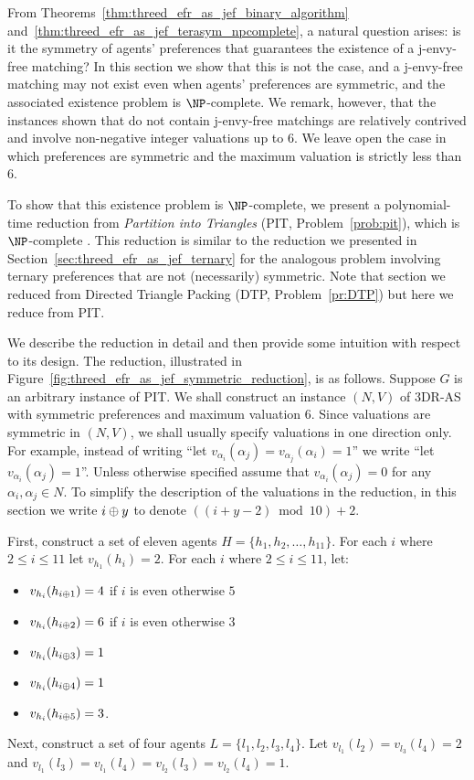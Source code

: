 From Theorems~\ref{thm:threed_efr_as_jef_binary_algorithm} and~\ref{thm:threed_efr_as_jef_terasym_npcomplete}, a natural question arises: is it the symmetry of agents' preferences that guarantees the existence of a j-envy-free matching? 
In this section we show that this is not the case, and a j-envy-free matching may not exist even when agents' preferences are symmetric, and the associated existence problem is $\NP$-complete. We remark, however, that the instances shown that do not contain j-envy-free matchings are relatively contrived and involve non-negative integer valuations up to $6$. We leave open the case in which preferences are symmetric and the maximum valuation is strictly less than $6$.

To show that this existence problem is $\NP$-complete, we present a polynomial-time reduction from \emph{Partition into Triangles} (PIT, Problem~\ref{prob:pit}), which is $\NP$-complete \cite{GJ79}. This reduction is similar to the reduction we presented in Section~\ref{sec:threed_efr_as_jef_ternary} for the analogous problem involving ternary preferences that are not (necessarily) symmetric. Note that section we reduced from Directed Triangle Packing (DTP, Problem~\ref{pr:DTP}) but here we reduce from PIT.

We describe the reduction in detail and then provide some intuition with respect to its design. The reduction, illustrated in Figure~\ref{fig:threed_efr_as_jef_symmetric_reduction}, is as follows. Suppose $G$ is an arbitrary instance of PIT. We shall construct an instance $(N, V)$ of 3DR-AS with symmetric preferences and maximum valuation $6$. Since valuations are symmetric in $(N, V)$, we shall usually specify valuations in one direction only. For example, instead of writing ``let $v_{\alpha_i}(\alpha_j)=v_{\alpha_j}(\alpha_i)=1$'' we write ``let $v_{\alpha_i}(\alpha_j)=1$''. Unless otherwise specified assume that $v_{\alpha_i}(\alpha_j)=0$ for any $\alpha_i, \alpha_j \in N$. To simplify the description of the valuations in the reduction, in this section we write $i \oplus y$ to denote $((i + y - 2) \bmod 10) + 2$. 

First, construct a set of eleven agents $H = \{ h_1, h_2, \dots, h_{11} \}$. For each $i$ where $2\leq i \leq 11$ let $v_{h_1}(h_i) = 2$. For each $i$ where $2\leq i \leq 11$, let:
\begin{itemize}
    \item $v_{h_i}(h_{i \oplus 1}) = 4$ if $i$ is even otherwise $5$
    \item $v_{h_i}(h_{i \oplus 2}) = 6$ if $i$ is even otherwise $3$
    \item $v_{h_i}(h_{i \oplus 3}) = 1$
    \item $v_{h_i}(h_{i \oplus 4}) = 1$
    \item $v_{h_i}(h_{i \oplus 5}) = 3$.
\end{itemize}
Next, construct a set of four agents $L = \{ l_1, l_2, l_3, l_4 \}$. Let $v_{l_1}(l_2) = v_{l_3}(l_4) = 2$ and $v_{l_1}(l_3) = v_{l_1}(l_4) = v_{l_2}(l_3) = v_{l_2}(l_4) = 1$.

